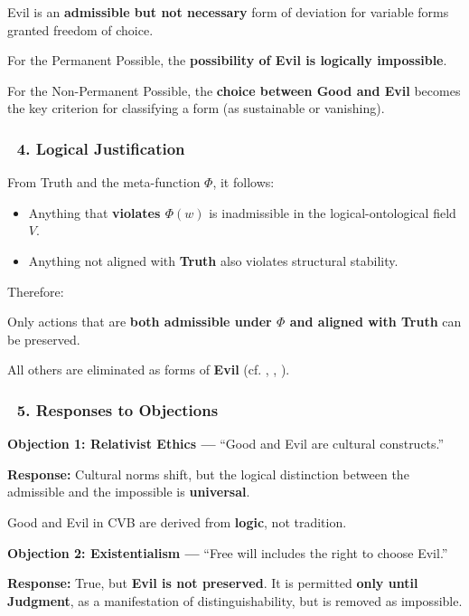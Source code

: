 \documentclass[12pt]{article}
\begin{document}
Evil is an \textbf{admissible but not necessary} form of deviation for variable forms granted freedom of choice.

For the Permanent Possible, the \textbf{possibility of Evil is logically impossible}.

For the Non-Permanent Possible, the \textbf{choice between Good and Evil} becomes the key criterion for classifying a form (as sustainable or vanishing).

\subsubsection*{🔹 4. Logical Justification}

From \text{[11.2]} Truth and \text{[11.1.1]} the meta-function $\Phi$, it follows:

\begin{itemize}
\item Anything that \textbf{violates $\Phi(w)$} is inadmissible in the logical-ontological field $V$.
\item Anything not aligned with \textbf{Truth} also violates structural stability.
\end{itemize}

Therefore:

Only actions that are \textbf{both admissible under $\Phi$ and aligned with Truth} can be preserved.

All others are eliminated as forms of \textbf{Evil} (cf. \text{[5.1]}, \text{[10.3.3]}, \text{[11.10]}).

\subsubsection*{🔹 5. Responses to Objections}

\textbf{Objection 1: Relativist Ethics —} ``Good and Evil are cultural constructs.''

\textbf{Response:} Cultural norms shift, but the logical distinction between the admissible and the impossible is \textbf{universal}.

Good and Evil in CVB are derived from \textbf{logic}, not tradition.

\textbf{Objection 2: Existentialism —} ``Free will includes the right to choose Evil.''

\textbf{Response:} True, but \textbf{Evil is not preserved}. It is permitted \textbf{only until Judgment}, as a manifestation of distinguishability, but is removed as impossible.
\end{document}
